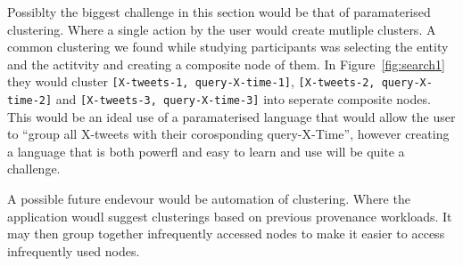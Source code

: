 Possiblty the biggest challenge in this section would be that of paramaterised clustering. Where a single action by the user would create mutliple clusters. A common clustering we found while studying participants was selecting the entity and the actitvity and creating a composite node of them. In Figure~\ref{fig:search1} they would cluster \texttt{[X-tweets-1, query-X-time-1]}, \texttt{[X-tweets-2, query-X-time-2]} and \texttt{[X-tweets-3, query-X-time-3]} into seperate composite nodes. This would be an ideal use of a paramaterised language that would allow the user to ``group all X-tweets with their corosponding query-X-Time'', however creating a language that is both powerfl and easy to learn and use will be quite a challenge.

A possible future endevour would be automation of clustering. Where the application woudl suggest clusterings based on previous provenance workloads. It may then group together infrequently accessed nodes to make it easier to access infrequently used nodes.

